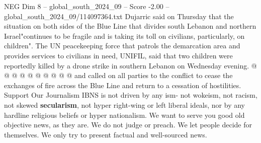 \begin{textsample}{NEG Dim 8 – global\_south\_2024\_09 – Score -2.00 – global\_south\_2024\_09/114097364.txt}
Dujarric said on Thursday that the situation on both sides of the Blue Line that divides south Lebanon and northern Israel"continues to be fragile and is taking its toll on civilians, particularly, on children".
The UN peacekeeping force that patrols the demarcation area and provides services to civilians in need, UNIFIL, said that two children were reportedly killed by a drone strike in southern Lebanon on Wednesday evening. @ @ @ @ @ @ @ @ @ @ and called on all parties to the conflict to cease the exchanges of fire across the Blue Line and return to a cessation of hostilities.
Support Our Journalism IBNS is not driven by any ism- not wokeism, not racism, not skewed \textbf{secularism}, not hyper right-wing or left liberal ideals, nor by any hardline religious beliefs or hyper nationalism.
We want to serve you good old objective news, as they are.
We do not judge or preach.
We let people decide for themselves.
We only try to present factual and well-sourced news.

\end{textsample}
